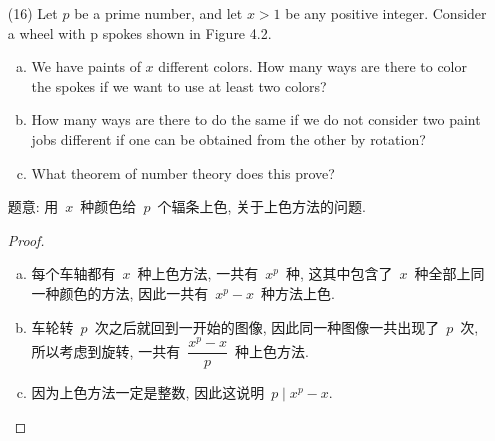 \documentclass[UTF8,a4paper,10pt]{article}
\begin{document}
\begin{enumerate}
	\item[(16)] Let $p$ be a prime number, and let $x > 1$ be any positive integer. Consider a wheel with p spokes shown in Figure 4.2.
	      \begin{enumerate}[(a)]
		      \item We have paints of $x$ different colors. How many ways are there to color the spokes if we want to use at least two colors?
		      \item How many ways are there to do the same if we do not consider two paint jobs different if one can be obtained from the other by rotation?
		      \item What theorem of number theory does this prove?
	      \end{enumerate}

	      题意: 用~$x$~种颜色给~$p$~个辐条上色, 关于上色方法的问题.
	      \begin{proof}
		      \begin{enumerate}[(a)]
			      \item 每个车轴都有~$x$~种上色方法, 一共有~$x^p$~种, 这其中包含了~$x$~种全部上同一种颜色的方法, 因此一共有~$x^p-x$~种方法上色.
			      \item 车轮转~$p$~次之后就回到一开始的图像, 因此同一种图像一共出现了~$p$~次, 所以考虑到旋转, 一共有~$\dfrac{x^p-x}{p}$~种上色方法.
			      \item 因为上色方法一定是整数, 因此这说明~$p\mid x^p-x$.
		      \end{enumerate}
	      \end{proof}
\end{enumerate}
\end{document}
